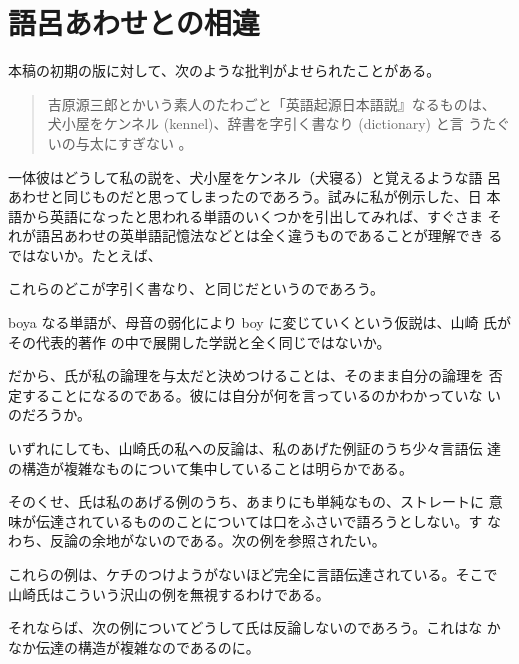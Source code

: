 \chapter{語呂あわせとの相違}

本稿の初期の版に対して、次のような批判がよせられたことがある。

\begin{quote}
    吉原源三郎とかいう素人のたわごと「英語起源日本語説』なるものは、
    犬小屋をケンネル (kennel)、辞書を字引く書なり (dictionary) と言
    うたぐいの与太にすぎない \cite{山崎91a}。
\end{quote}

  一体彼はどうして私の説を、犬小屋をケンネル（犬寝る）と覚えるような語
呂あわせと同じものだと思ってしまったのであろう。試みに私が例示した、日
本語から英語になったと思われる単語のいくつかを引出してみれば、すぐさま
それが語呂あわせの英単語記憶法などとは全く違うものであることが理解でき
るではないか。たとえば、

\noindent
これらのどこが字引く書なり、と同じだというのであろう。

  boya なる単語が、母音の弱化により boy に変じていくという仮説は、山崎
氏がその代表的著作 の中で展開した学説と全く同じではないか。

  だから、氏が私の論理を与太だと決めつけることは、そのまま自分の論理を
否定することになるのである。彼には自分が何を言っているのかわかっていな
いのだろうか。

  いずれにしても、山崎氏の私への反論は、私のあげた例証のうち少々言語伝
達の構造が複雑なものについて集中していることは明らかである。

  そのくせ、氏は私のあげる例のうち、あまりにも単純なもの、ストレートに
意味が伝達されているもののことについては口をふさいで語ろうとしない。す
なわち、反論の余地がないのである。次の例を参照されたい。

\noindent
これらの例は、ケチのつけようがないほど完全に言語伝達されている。そこで
山崎氏はこういう沢山の例を無視するわけである。

  それならば、次の例についてどうして氏は反論しないのであろう。これはな
かなか伝達の構造が複雑なのであるのに。

